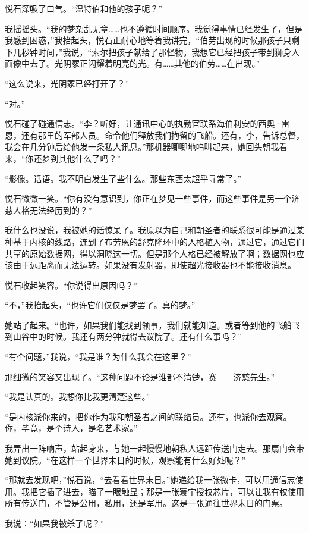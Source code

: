 \documentclass[AutoFakeBold=true]{book}
\begin{document}
悦石深吸了口气。``温特伯和他的孩子呢？''

我摇摇头。``我的梦杂乱无章……也不遵循时间顺序。我觉得事情已经发生了，但是我感到困惑，''我抬起头，悦石正耐心地等着我讲完，``伯劳出现的时候那孩子只剩下几秒钟时间，''我说，``索尔把孩子献给了那怪物。我想它已经把孩子带到狮身人面像中去了。光阴冢正闪耀着明亮的光。有……其他的伯劳……在出现。''

``这么说来，光阴冢已经打开了？''

``对。''

悦石碰了碰通信志。``李？听好，让通讯中心的执勤官联系海伯利安的西奥·雷恩，还有那里的军部人员。命令他们释放我们拘留的飞船。还有，李，告诉总督，我会在几分钟后给他发一条私人讯息。''那机器唧唧地呜叫起来，她回头朝我看来，``你还梦到其他什么了吗？''

``影像。话语。我不明白发生了些什么。那些东西太超乎寻常了。''

悦石微微一笑。``你有没有意识到，你正在梦见一些事件，而这些事件是另一个济慈人格无法经历到的？''

我什么也没说，我被她的话惊呆了。我原以为自己和朝圣者的联系很可能是通过某种基于内核的线路，连到了布劳恩的舒克隆环中的人格植入物，通过它，通过它们共享的原始数据网，得以洞晓这一切。但是那个人格已经被解放了啊；数据网也应该由于远距离而无法运转。如果没有发射器，即使超光接收器也不能接收消息。

悦石收起笑容。``你说得出原因吗？''

``不，''我抬起头，``也许它们仅仅是梦罢了。真的梦。''

她站了起来。``也许，如果我们能找到领事，我们就能知道。或者等到他的飞船飞到山谷中的时候。我还有两分钟就得去议院了。还有什么事吗？''

``有个问题，''我说，``我是谁？为什么我会在这里？''

那细微的笑容又出现了。``这种问题不论是谁都不清楚，赛——济慈先生。''

``我是认真的。我想你比我更清楚这些。''

``是内核派你来的，把你作为我和朝圣者之间的联络员。还有，也派你去观察。你，毕竟，是个诗人，是名艺术家。''

我弄出一阵响声，站起身来，与她一起慢慢地朝私人远距传送门走去。那扇门会带她到议院。``在这样一个世界末日的时候，观察能有什么好处呢？''

``那就去发现吧，''悦石说，``去看看世界末日。''她递给我一张微卡，可以用通信志使用。我把它插了进去，瞄了一眼触显；那是一张寰宇授权芯片，可以让我有权使用所有传送门，不管是公用，私用，还是军用。这是一张通往世界末日的门票。

我说：``如果我被杀了呢？''
\end{document}
